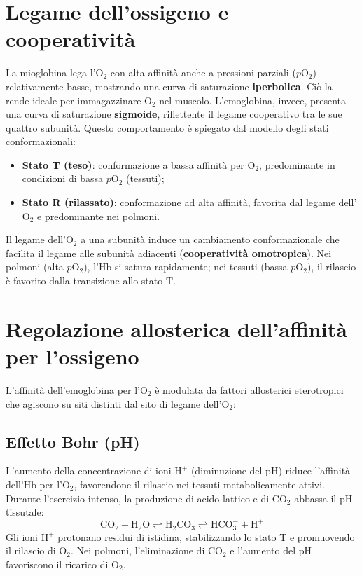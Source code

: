 \documentclass[12pt,a4paper]{report}
\begin{document}
\section{Legame dell'ossigeno e cooperatività}
La mioglobina lega l'\(\mathrm{O_2}\) con alta affinità anche a pressioni parziali (\(p\mathrm{O_2}\)) relativamente basse, mostrando una curva di saturazione \textbf{iperbolica}. Ciò la rende ideale per immagazzinare \(\mathrm{O_2}\) nel muscolo.
L'emoglobina, invece, presenta una curva di saturazione \textbf{sigmoide}, riflettente il legame cooperativo tra le sue quattro subunità. Questo comportamento è spiegato dal modello degli stati conformazionali:
\begin{itemize}
\item \textbf{Stato T (teso)}: conformazione a bassa affinità per \(\mathrm{O_2}\), predominante in condizioni di bassa \(p\mathrm{O_2}\) (tessuti);
\item \textbf{Stato R (rilassato)}: conformazione ad alta affinità, favorita dal legame dell'\(\mathrm{O_2}\) e predominante nei polmoni.
\end{itemize}
Il legame dell'\(\mathrm{O_2}\) a una subunità induce un cambiamento conformazionale che facilita il legame alle subunità adiacenti (\textbf{cooperatività omotropica}). Nei polmoni (alta \(p\mathrm{O_2}\)), l'Hb si satura rapidamente; nei tessuti (bassa \(p\mathrm{O_2}\)), il rilascio è favorito dalla transizione allo stato T.

\section{Regolazione allosterica dell'affinità per l'ossigeno}
L'affinità dell'emoglobina per l'\(\mathrm{O_2}\) è modulata da fattori allosterici eterotropici che agiscono su siti distinti dal sito di legame dell'\(\mathrm{O_2}\):
\subsection{Effetto Bohr (pH)}
L'aumento della concentrazione di ioni \(\mathrm{H^+}\) (diminuzione del pH) riduce l'affinità dell'Hb per l'\(\mathrm{O_2}\), favorendone il rilascio nei tessuti metabolicamente attivi. Durante l'esercizio intenso, la produzione di acido lattico e di \(\mathrm{CO_2}\) abbassa il pH tissutale:
\[
\mathrm{CO_2 + H_2O \rightleftharpoons H_2CO_3 \rightleftharpoons HCO_3^- + H^+}
\]
Gli ioni \(\mathrm{H^+}\) protonano residui di istidina, stabilizzando lo stato T e promuovendo il rilascio di \(\mathrm{O_2}\). Nei polmoni, l'eliminazione di \(\mathrm{CO_2}\) e l'aumento del pH favoriscono il ricarico di \(\mathrm{O_2}\).
\end{document}
